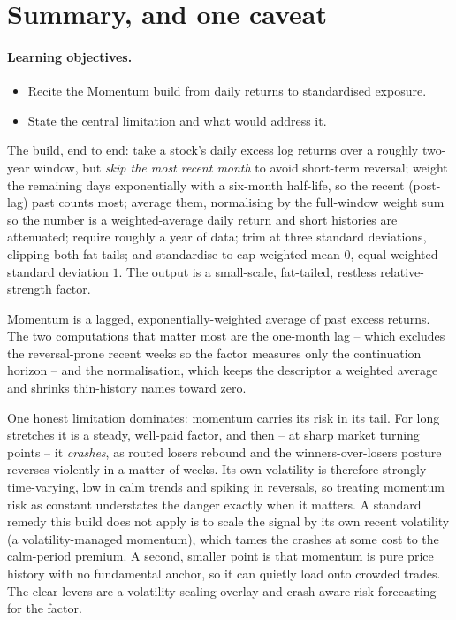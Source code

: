 \documentclass[11pt]{article}
\theoremstyle{definition}
\theoremstyle{plain}
\theoremstyle{remark}
\begin{document}
\section{Summary, and one caveat}\label{sec:summary}

\paragraph{Learning objectives.}
\begin{itemize}[leftmargin=1.4em,topsep=2pt]
  \item Recite the Momentum build from daily returns to standardised exposure.
  \item State the central limitation and what would address it.
\end{itemize}

The build, end to end: take a stock's daily excess log returns over a roughly two-year window, but \emph{skip the most recent month} to avoid short-term reversal; weight the remaining days exponentially with a six-month half-life, so the recent (post-lag) past counts most; average them, normalising by the full-window weight sum so the number is a weighted-average daily return and short histories are attenuated; require roughly a year of data; trim at three standard deviations, clipping both fat tails; and standardise to cap-weighted mean $0$, equal-weighted standard deviation $1$. The output is a small-scale, fat-tailed, restless relative-strength factor.

\begin{keyresult}
Momentum is a lagged, exponentially-weighted average of past excess returns. The two computations that matter most are the one-month lag -- which excludes the reversal-prone recent weeks so the factor measures only the continuation horizon -- and the normalisation, which keeps the descriptor a weighted average and shrinks thin-history names toward zero.
\end{keyresult}

\begin{pitfall}
One honest limitation dominates: momentum carries its risk in its tail. For long stretches it is a steady, well-paid factor, and then -- at sharp market turning points -- it \emph{crashes}, as routed losers rebound and the winners-over-losers posture reverses violently in a matter of weeks. Its own volatility is therefore strongly time-varying, low in calm trends and spiking in reversals, so treating momentum risk as constant understates the danger exactly when it matters. A standard remedy this build does not apply is to scale the signal by its own recent volatility (a volatility-managed momentum), which tames the crashes at some cost to the calm-period premium. A second, smaller point is that momentum is pure price history with no fundamental anchor, so it can quietly load onto crowded trades. The clear levers are a volatility-scaling overlay and crash-aware risk forecasting for the factor.
\end{pitfall}
\end{document}
